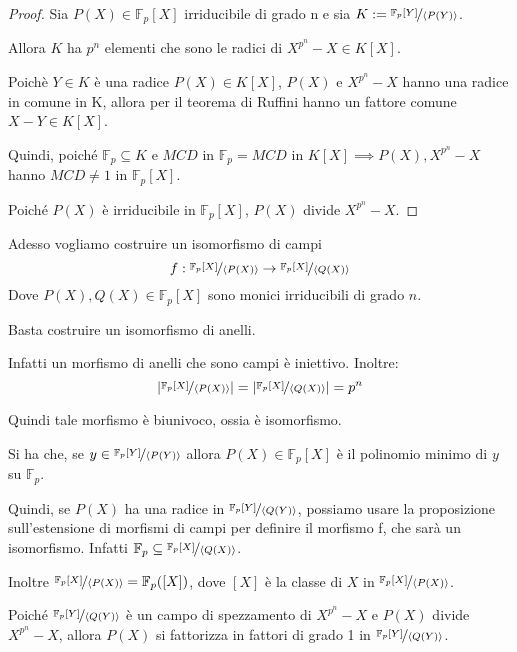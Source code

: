 \documentclass[10pt,a4paper,twoside]{book}
\begin{document}
\begin{proof}
    Sia $P(X) \in \mathbb{F}_p[X]$ irriducibile di grado n e sia $K := \nicefrac{\mathbb{F}_p[Y]}{\langle P(Y)\rangle}$.

    Allora $K$ ha $p^n$ elementi che sono le radici di $X^{p^n} - X \in K[X]$.

    Poichè $Y \in K$ è una radice $P(X) \in K[X]$, $P(X)$ e $X^{p^n} - X$ hanno una radice in comune in K, allora per il teorema di Ruffini hanno un fattore comune $X - Y \in K[X]$.

    Quindi, poiché $\mathbb{F}_p \subseteq K$ e $MCD$ in $\mathbb{F}_p = MCD$ in $K[X] \implies P(X), X^{p^n} - X$ hanno $MCD \neq 1$ in $\mathbb{F}_p[X]$.

    Poiché $P(X)$ è irriducibile in $\mathbb{F}_p[X]$, $P(X)$ divide $X^{p^n} - X$.
\end{proof}

Adesso vogliamo costruire un isomorfismo di campi
\begin{equation*}
    f: \nicefrac{\mathbb{F}_p[X]}{\langle P(X)\rangle} \rightarrow \nicefrac{\mathbb{F}_p[X]}{\langle Q(X)\rangle}
\end{equation*}
Dove $P(X), Q(X) \in \mathbb{F}_p[X]$ sono monici irriducibili di grado $n$.

Basta costruire un isomorfismo di anelli.

Infatti un morfismo di anelli che sono campi è iniettivo. Inoltre:
\begin{equation*}
    |\nicefrac{\mathbb{F}_p[X]}{\langle P(X)\rangle}| = |\nicefrac{\mathbb{F}_p[X]}{\langle Q(X)\rangle}| = p^n
\end{equation*}

Quindi tale morfismo è biunivoco, ossia è isomorfismo.

Si ha che, se $y \in \nicefrac{\mathbb{F}_p[Y]}{\langle P(Y)\rangle}$ allora $P(X) \in \mathbb{F}_p[X]$ è il polinomio minimo di $y$ su $\mathbb{F}_p$.

Quindi, se $P(X)$ ha una radice in $\nicefrac{\mathbb{F}_p[Y]}{\langle Q(Y)\rangle}$, possiamo usare la proposizione sull'estensione di morfismi di campi per definire il morfismo f, che sarà un isomorfismo. Infatti $\mathbb{F}_p \subseteq \nicefrac{\mathbb{F}_p[X]}{\langle Q(X)\rangle}$.

Inoltre $\nicefrac{\mathbb{F}_p[X]}{\langle P(X)\rangle} = \mathbb{F}_p([X])$, dove $[X]$ è la classe di $X$ in $\nicefrac{\mathbb{F}_p[X]}{\langle P(X)\rangle}$.

Poiché $\nicefrac{\mathbb{F}_p[Y]}{\langle Q(Y)\rangle}$ è un campo di spezzamento di $X^{p^n} - X$ e $P(X)$ divide $X^{p^n} - X$, allora $P(X)$ si fattorizza in fattori di grado 1 in $\nicefrac{\mathbb{F}_p[Y]}{\langle Q(Y)\rangle}$.
\end{document}
